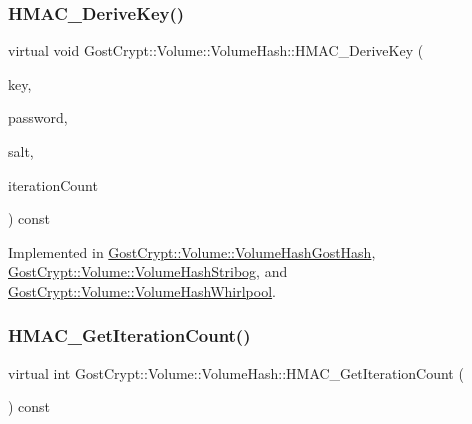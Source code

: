 \subsubsection{\texorpdfstring{H\+M\+A\+C\+\_\+\+Derive\+Key()}{HMAC\_DeriveKey()}\hspace{0.1cm}{\footnotesize\ttfamily [2/2]}}
{\footnotesize\ttfamily virtual void Gost\+Crypt\+::\+Volume\+::\+Volume\+Hash\+::\+H\+M\+A\+C\+\_\+\+Derive\+Key (\begin{DoxyParamCaption}\item[{const \hyperlink{class_gost_crypt_1_1_buffer_ptr}{Buffer\+Ptr} \&}]{key,  }\item[{const \hyperlink{class_gost_crypt_1_1_volume_1_1_volume_password}{Volume\+Password} \&}]{password,  }\item[{const \hyperlink{class_gost_crypt_1_1_buffer_ptr}{Buffer\+Ptr} \&}]{salt,  }\item[{int}]{iteration\+Count }\end{DoxyParamCaption}) const\hspace{0.3cm}{\ttfamily [pure virtual]}}



Implemented in \hyperlink{class_gost_crypt_1_1_volume_1_1_volume_hash_gost_hash_a00e9f9090440a18c5a9c75a3bcc9b1a7}{Gost\+Crypt\+::\+Volume\+::\+Volume\+Hash\+Gost\+Hash}, \hyperlink{class_gost_crypt_1_1_volume_1_1_volume_hash_stribog_a691a1c92b9a4b33e817c72b7aa50bc61}{Gost\+Crypt\+::\+Volume\+::\+Volume\+Hash\+Stribog}, and \hyperlink{class_gost_crypt_1_1_volume_1_1_volume_hash_whirlpool_a6206f814090643431376953400727853}{Gost\+Crypt\+::\+Volume\+::\+Volume\+Hash\+Whirlpool}.

\mbox{\label{class_gost_crypt_1_1_volume_1_1_volume_hash_a7f565609ef9bd178423575603b252d33}} 
\subsubsection{\texorpdfstring{H\+M\+A\+C\+\_\+\+Get\+Iteration\+Count()}{HMAC\_GetIterationCount()}}
{\footnotesize\ttfamily virtual int Gost\+Crypt\+::\+Volume\+::\+Volume\+Hash\+::\+H\+M\+A\+C\+\_\+\+Get\+Iteration\+Count (\begin{DoxyParamCaption}{ }\end{DoxyParamCaption}) const\hspace{0.3cm}{\ttfamily [pure virtual]}}



